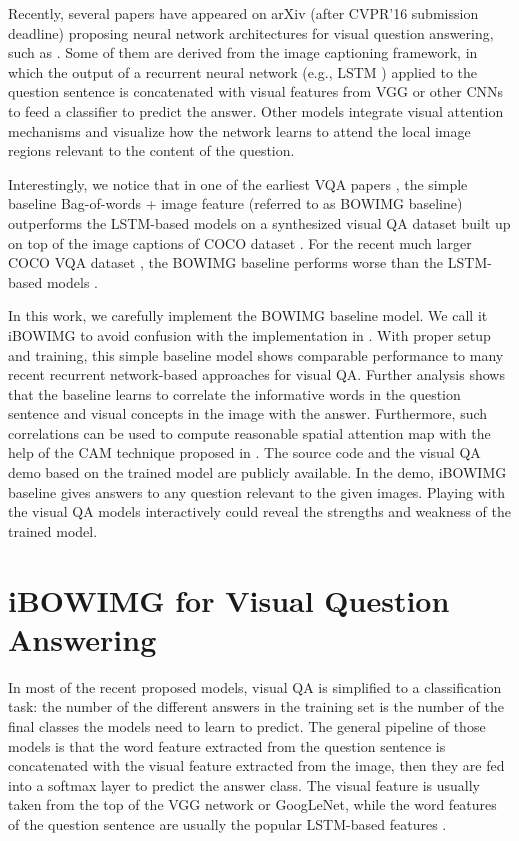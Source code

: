 \documentclass{article} \usepackage{nips14submit_e,times}
\begin{document}
Recently, several papers have appeared on arXiv (after CVPR'16 submission deadline) proposing neural network architectures for visual question answering, such as \cite{shih2015look,xu2015ask,gao2015you,yang2015stacked,wu2015ask,chen2015abc,noh2015image,andreas2015deep}. Some of them are derived from the image captioning framework, in which the output of a recurrent neural network (e.g., LSTM \cite{wu2015ask, noh2015image, andreas2015deep}) applied to the question sentence is concatenated with visual features from VGG or other CNNs to feed a classifier to predict the answer. Other models integrate visual attention mechanisms \cite{xu2015ask,shih2015look,chen2015abc} and visualize how the network learns to attend the local image regions relevant to the content of the question.   

Interestingly, we notice that in one of the earliest VQA papers \cite{ren2015exploring}, the simple baseline Bag-of-words + image feature (referred to as BOWIMG baseline) outperforms the LSTM-based models on a synthesized visual QA dataset built up on top of the image captions of COCO dataset \cite{lin2014microsoft}. For the recent much larger COCO VQA dataset \cite{antol2015vqa}, the BOWIMG baseline performs worse than the LSTM-based models \cite{antol2015vqa}. 

In this work, we carefully implement the BOWIMG baseline model. We call it iBOWIMG to avoid confusion with the implementation in \cite{antol2015vqa}. With proper setup and training, this simple baseline model shows comparable performance to many recent recurrent network-based approaches for visual QA. Further analysis shows that the baseline learns to correlate the informative words in the question sentence and visual concepts in the image with the answer. Furthermore, such correlations can be used to compute reasonable spatial attention map with the help of the CAM technique proposed in \cite{zhou2014learning}. The source code and the visual QA demo based on the trained model are publicly available. In the demo, iBOWIMG baseline gives answers to any question relevant to the given images. Playing with the visual QA models interactively could reveal the strengths and weakness of the trained model. 

\section{iBOWIMG for Visual Question Answering}
In most of the recent proposed models, visual QA is simplified to a classification task: the number of the different answers in the training set is the number of the final classes the models need to learn to predict. The general pipeline of those models is that the word feature extracted from the question sentence is concatenated with the visual feature extracted from the image, then they are fed into a softmax layer to predict the answer class. The visual feature is usually taken from the top of the VGG network or GoogLeNet, while the word features of the question sentence are usually the popular LSTM-based features \cite{ren2015exploring,antol2015vqa}. 
\end{document}
